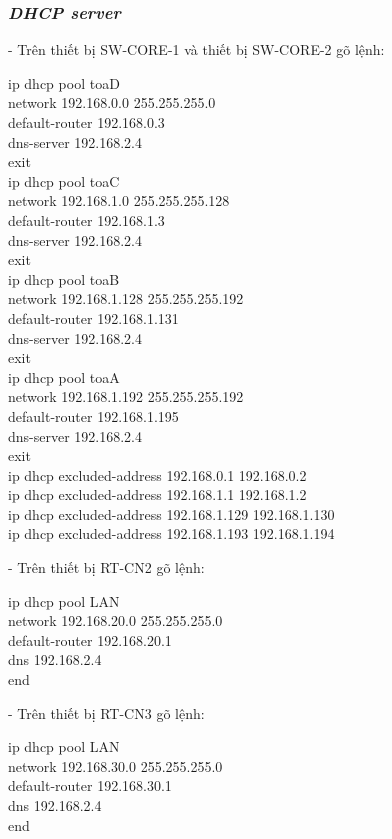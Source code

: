 \documentclass[12pt, a4paper]{article}
\begin{document}
	\subsubsection{\textit{DHCP server}}
	\begin{flushleft}
		- Trên thiết bị SW-CORE-1 và thiết bị SW-CORE-2 gõ lệnh:
		\begin{tcolorbox}
			ip dhcp pool toaD\\
			network 192.168.0.0 255.255.255.0\\
			default-router 192.168.0.3\\
			dns-server 192.168.2.4\\
			exit\\
			ip dhcp pool toaC\\
			network 192.168.1.0 255.255.255.128\\
			default-router 192.168.1.3\\
			dns-server 192.168.2.4\\
			exit\\
			ip dhcp pool toaB\\
			network 192.168.1.128 255.255.255.192\\
			default-router 192.168.1.131\\
			dns-server 192.168.2.4\\
			exit\\
			ip dhcp pool toaA\\
			network 192.168.1.192 255.255.255.192\\
			default-router 192.168.1.195\\
			dns-server 192.168.2.4\\
			exit\\
			ip dhcp excluded-address 192.168.0.1 192.168.0.2\\
			ip dhcp excluded-address 192.168.1.1 192.168.1.2\\
			ip dhcp excluded-address 192.168.1.129 192.168.1.130\\
			ip dhcp excluded-address 192.168.1.193 192.168.1.194
		\end{tcolorbox}
		
		\newpage
		- Trên thiết bị RT-CN2 gõ lệnh:
		\begin{tcolorbox}
			ip dhcp pool LAN\\
			network 192.168.20.0 255.255.255.0\\
			default-router 192.168.20.1\\
			dns 192.168.2.4\\
			end
		\end{tcolorbox}
		- Trên thiết bị RT-CN3 gõ lệnh:
		\begin{tcolorbox}
			ip dhcp pool LAN\\
			network 192.168.30.0 255.255.255.0\\
			default-router 192.168.30.1\\
			dns 192.168.2.4\\
			end
		\end{tcolorbox}
	\end{flushleft}
	
\end{document}
